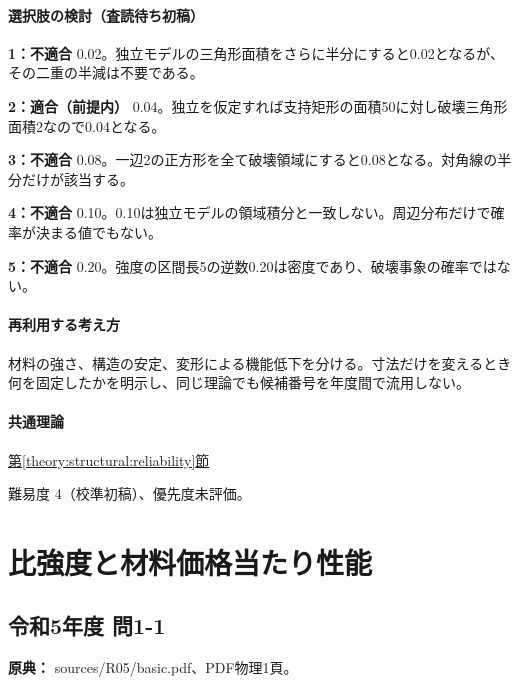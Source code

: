\paragraph{選択肢の検討（査読待ち初稿）}\mbox{}\par

\noindent\textbf{1：不適合} 0.02。独立モデルの三角形面積をさらに半分にすると0.02となるが、その二重の半減は不要である。\par

\noindent\textbf{2：適合（前提内）} 0.04。独立を仮定すれば支持矩形の面積50に対し破壊三角形面積2なので0.04となる。\par

\noindent\textbf{3：不適合} 0.08。一辺2の正方形を全て破壊領域にすると0.08となる。対角線の半分だけが該当する。\par

\noindent\textbf{4：不適合} 0.10。0.10は独立モデルの領域積分と一致しない。周辺分布だけで確率が決まる値でもない。\par

\noindent\textbf{5：不適合} 0.20。強度の区間長5の逆数0.20は密度であり、破壊事象の確率ではない。\par

\paragraph{再利用する考え方} 材料の強さ、構造の安定、変形による機能低下を分ける。寸法だけを変えるとき何を固定したかを明示し、同じ理論でも候補番号を年度間で流用しない。

\paragraph{共通理論} \hyperref[theory:structural:reliability]{第\ref*{theory:structural:reliability}節}

\par 難易度 4（校準初稿）、優先度未評価。

\section{比強度と材料価格当たり性能}

\subsection{令和5年度 問1-1}
\label{q:r05-reg-basic-1-1}

\noindent\textbf{原典：} sources/R05/basic.pdf、PDF物理1頁。

